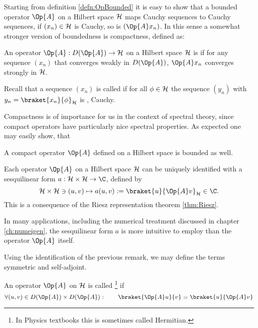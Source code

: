 Starting from definition \ref{defn:OpBounded}
it is easy to show that a bounded operator $\Op{A}$ on a Hilbert
space $\mathcal{H}$ maps Cauchy sequences to Cauchy sequences,
\ie if $(x_n) \in \mathcal{H}$ is Cauchy, so is $(\Op{A} x_n)$.
In this sense a somewhat stronger version of boundedness
is compactness, defined as:
\begin{defn}
	An operator $\Op{A} : D(\Op{A}) \to \hilbert$ on a Hilbert space $\mathcal{H}$
	is 
	if for any sequence $(x_n)$ that converges weakly in $D(\Op{A})$,
	$\Op{A} x_n$ converges strongly in $\mathcal{H}$.

	Recall that a sequence $(x_n)$ is called 
	if for all $\phi \in \mathcal{H}$ the sequence $(y_n)$ with
	$y_n = \braket{x_n}{\phi}_\hilbert$
	is , \ie Cauchy.
\end{defn}
Compactness is of importance for us in the context of spectral theory,
since compact operators have particularly nice spectral properties.
As expected one may easily show, that~
\begin{prop}
	A compact operator $\Op{A}$ defined on a Hilbert space is bounded as well.
\end{prop}

\begin{rem}
\label{rem:OpRietz}
Each operator $\Op{A}$ on a Hilbert space $\mathcal{H}$ can be
uniquely identified with a sesquilinear form
$a : \hilbert \times \hilbert \to \C$, defined by
\begin{equation}
	\hilbert \times \hilbert \ni (u, v) \mapsto a(u, v) := \braket{u}{\Op{A} v}_\hilbert \in \C.
	\label{eqn:formA}
\end{equation}
This is a consequence of the Riesz representation theorem \vref{thm:Riesz}.

In many applications, including the numerical treatment discussed in chapter
\vref{ch:numeigen},
the sesquilinear form $a$ is more intuitive to employ than the operator $\Op{A}$ itself.
\end{rem}

Using the identification of the previous remark,
we may define the terms symmetric and self-adjoint.
\begin{defn}
	\label{def:SymmetricOperator}
	An operator $\Op{A}$ on $\mathcal{H}$ is called %
	\footnote{In Physics textbooks this is sometimes called Hermitian.}
	if
	\[ \forall (u, v) \in D(\Op{A}) \times D(\Op{A}): \qquad \braket{\Op{A} u}{v} = \braket{u}{\Op{A} v} \]
\end{defn}


